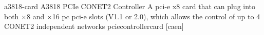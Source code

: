 \newglsXequipment%
{a3818-card}%
{A3818 PCIe CONET2 Controller}%
{A \gls{pci-e} x8 card that can plug into both $\times$8 and $\times$16 \gls{pc} \gls{pci-e} slots (V1.1 or 2.0), which allows the control of up to 4 CONET2 independent networks}%
{pciecontrollercard}%
[caen]%